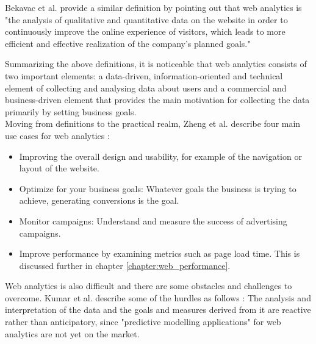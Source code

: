 Bekavac et al. provide a similar definition by pointing out that web analytics is "the analysis of qualitative and quantitative data on the website in order to continuously improve the online experience of visitors, which leads to more efficient and effective realization of the company's planned goals." \cite{2015Bekavac}




Summarizing the above definitions, it is noticeable that web analytics consists of two important elements: a data-driven, information-oriented and technical element of collecting and analysing data about users and a commercial and business-driven element that provides the main motivation for collecting the data primarily by setting business goals.
\\

Moving from definitions to the practical realm, Zheng et al. describe four main use cases for web analytics \cite{2015Zheng}:

\begin{itemize}
\item Improving the overall design and usability, for example of the navigation or layout of the website.
\item Optimize for your business goals: Whatever goals the business is trying to achieve, generating conversions is the goal.
\item Monitor campaigns: Understand and measure the success of advertising campaigns.
\item Improve performance by examining metrics such as page load time. This is discussed further in chapter \ref{chapter:web_performance}.
\end{itemize}

Web analytics is also difficult and there are some obstacles and challenges to overcome.
Kumar et al. describe some of the hurdles as follows \cite{2019Kumar}:
The analysis and interpretation of the data and the goals and measures derived from it are reactive rather than anticipatory, since "predictive modelling applications" for web analytics are not yet on the market.

